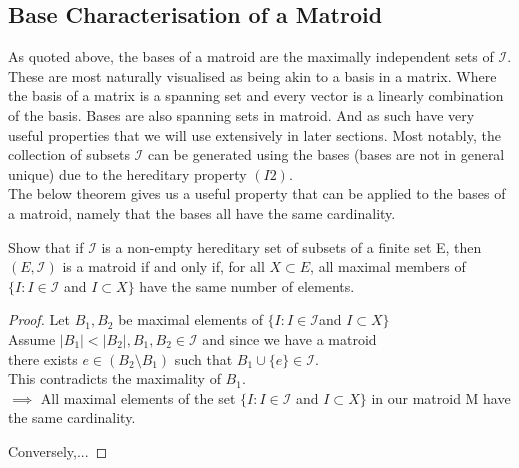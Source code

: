 \documentclass[../main.tex]{subfiles}
\begin{document}
 \subsection{Base Characterisation of a Matroid}
As quoted above, the bases of a matroid are the maximally independent sets of $\mathcal{I}.$  These are most naturally visualised as being akin to a basis in a matrix. Where the basis of a matrix is a spanning set and every vector is a linearly combination of the basis. Bases are also spanning sets in  matroid. And as such have very useful properties that we will use extensively in later sections. Most notably, the collection of subsets $\mathcal{I}$ can be generated using the bases (bases are not in general unique) due to the hereditary property $(I2).$ \\
The below theorem gives us a useful property that can be applied to the bases of a matroid, namely that the bases all have the same cardinality.
 \begin{thm}
 Show that if $\mathcal{I}$ is a non-empty hereditary set of subsets of a finite set E, then $(E,\mathcal{I})$ is a matroid if and only if, for all $X \subset E$, all maximal members of $\{I : I \in \mathcal{I} $ and $ I \subset X\}$ have the same number of elements.
 \end{thm}
\begin{proof}
 Let $B_1 , B_2$ be maximal elements of $\{I : I \in \mathcal{I} $and $ I \subset X\}$ \\
\noindent Assume $|B_1| < |B_2|, B_1, B_2 \in \mathcal{I}$ and since we have a matroid
\\
there exists $e \in (B_2 \setminus B_1)$ such that $B_1 \cup \{e\} \in \mathcal{I}.$
\\
This contradicts the maximality of $B_1$.\\
 \noindent $\implies$ All maximal elements of the set $\{I : I \in \mathcal{I} $ and $ I \subset X\}$ in our matroid M have the same cardinality.

Conversely,...
\end{proof}
 
\end{document}
